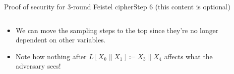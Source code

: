 \documentclass[aspectratio=169, lualatex, handout]{beamer}
\begin{document}
	\begin{frame}{Proof of security for 3-round Feistel cipher}{Step 6 (this content is optional)}
		\begin{columns}[c]
			\begin{column}{0.5\textwidth}
				\begin{itemize}[<+->]
					\item We can move the sampling steps to the top since they're no longer dependent on other variables.
					\item Note how nothing after $L[X_0\|X_1] \coloneq X_3\|X_4$ affects what the adversary sees!
				\end{itemize}
			\end{column}
			\begin{column}{0.5\textwidth}
				\vspace{-1.5cm}
				\begin{center}
				\end{center}
			\end{column}
		\end{columns}
	\end{frame}
\end{document}
